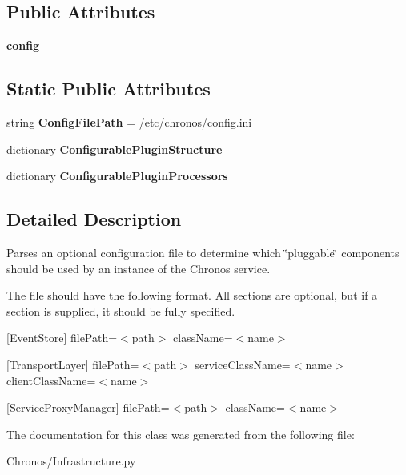 \subsection*{Public Attributes}
\begin{DoxyCompactItemize}
\item 
{\bfseries config}
\end{DoxyCompactItemize}
\subsection*{Static Public Attributes}
\begin{DoxyCompactItemize}
\item 
string {\bfseries Config\+File\+Path} = \textquotesingle{}/etc/chronos/config.\+ini\textquotesingle{}
\item 
dictionary {\bfseries Configurable\+Plugin\+Structure}
\item 
dictionary {\bfseries Configurable\+Plugin\+Processors}
\end{DoxyCompactItemize}


\subsection{Detailed Description}
Parses an optional configuration file to determine which \char`\"{}pluggable\char`\"{} components should be used by an instance of the Chronos service. 

The file should have the following format. All sections are optional, but if a section is supplied, it should be fully specified.

\mbox{[}Event\+Store\mbox{]} file\+Path=$<$path$>$ class\+Name=$<$name$>$

\mbox{[}Transport\+Layer\mbox{]} file\+Path=$<$path$>$ service\+Class\+Name=$<$name$>$ client\+Class\+Name=$<$name$>$

\mbox{[}Service\+Proxy\+Manager\mbox{]} file\+Path=$<$path$>$ class\+Name=$<$name$>$ 

The documentation for this class was generated from the following file\+:\begin{DoxyCompactItemize}
\item 
Chronos/Infrastructure.\+py\end{DoxyCompactItemize}
